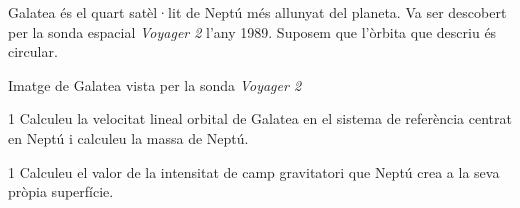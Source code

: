 Galatea és el quart satèl·lit de Neptú més allunyat del planeta. Va ser descobert per la sonda espacial \textit{Voyager 2} l'any 1989. Suposem que l'òrbita que descriu és circular.

{\centering Imatge de Galatea vista per la sonda \textit{Voyager 2}\par}

\begin{apartat}{1}
Calculeu la velocitat lineal orbital de Galatea en el sistema de referència centrat en Neptú i calculeu la massa de Neptú.
\end{apartat}

\begin{apartat}{1}
Calculeu el valor de la intensitat de camp gravitatori que Neptú crea a la seva pròpia superfície.
\end{apartat}


